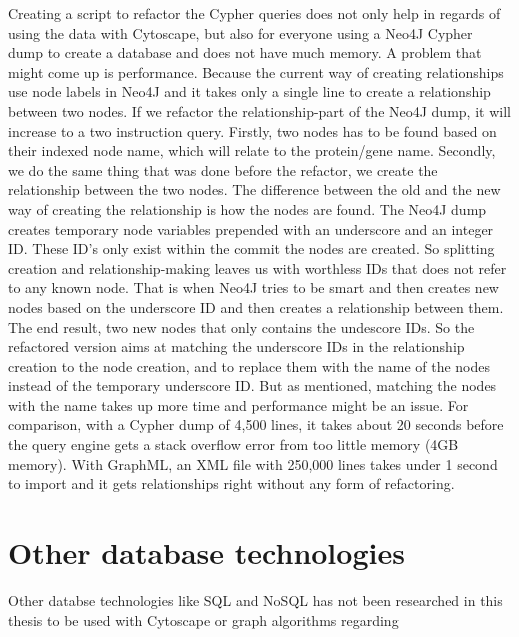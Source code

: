 Creating a script to refactor the Cypher queries does not only help in regards
of using the data with Cytoscape, but also for everyone using a Neo4J Cypher
dump to create a database and does not have much memory. A problem that might
come up is performance. Because the current way of creating relationships use
node labels in Neo4J and it takes only a single line to create a relationship
between two nodes. If we refactor the relationship-part of the Neo4J dump, it
will increase to a two instruction query. Firstly, two nodes has to be found
based on their indexed node name, which will relate to the protein/gene name.
Secondly, we do the same thing that was done before the refactor, we create the
relationship between the two nodes. The difference between the old and the new
way of creating the relationship is how the nodes are found. The Neo4J dump
creates temporary node variables prepended with an underscore and an integer ID.
These ID's only exist within the commit the nodes are created. So splitting
creation and relationship-making leaves us with worthless IDs that does not
refer to any known node. That is when Neo4J tries to be smart and then creates
new nodes based on the underscore ID and then creates a relationship between
them. The end result, two new nodes that only contains the undescore IDs. So the
refactored version aims at matching the underscore IDs in the relationship
creation to the node creation, and to replace them with the name of the nodes
instead of the temporary underscore ID. But as mentioned, matching the nodes
with the name takes up more time and performance might be an issue. For
comparison, with a Cypher dump of 4,500 lines, it takes about 20 seconds before
the query engine gets a stack overflow error from too little memory (4GB
memory). With GraphML, an XML file with 250,000 lines takes under 1 second to
import and it gets relationships right without any form of refactoring.

\section{Other database technologies}
Other databse technologies like SQL and NoSQL has not been researched in this
thesis to be used with Cytoscape or graph algorithms regarding 
